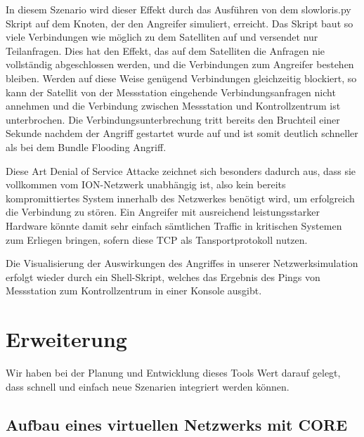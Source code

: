 \documentclass{article}
\begin{document}
In diesem Szenario wird dieser Effekt durch das Ausführen von dem slowloris.py Skript auf dem Knoten, der den Angreifer simuliert, erreicht. Das Skript baut so viele Verbindungen wie möglich zu dem Satelliten auf und versendet nur Teilanfragen. Dies hat den Effekt, das auf dem Satelliten die Anfragen nie vollständig abgeschlossen werden, und die Verbindungen zum Angreifer bestehen bleiben. Werden auf diese Weise genügend Verbindungen gleichzeitig blockiert, so kann der Satellit von der  Messstation eingehende Verbindungsanfragen nicht annehmen und die Verbindung zwischen Messstation und Kontrollzentrum ist unterbrochen. Die Verbindungsunterbrechung tritt bereits den Bruchteil einer Sekunde nachdem der Angriff gestartet wurde auf und ist somit deutlich schneller als bei dem Bundle Flooding Angriff.\par
Diese Art Denial of Service Attacke zeichnet sich besonders dadurch aus, dass sie vollkommen vom ION-Netzwerk unabhängig ist, also kein bereits kompromittiertes System innerhalb des Netzwerkes benötigt wird, um erfolgreich die Verbindung zu stören. Ein Angreifer mit ausreichend leistungsstarker Hardware könnte damit sehr einfach sämtlichen Traffic in kritischen Systemen zum Erliegen bringen, sofern diese TCP als Tansportprotokoll nutzen.\par
Die Visualisierung der Auswirkungen des Angriffes in unserer Netzwerksimulation erfolgt wieder durch ein Shell-Skript, welches das Ergebnis des Pings von Messstation zum Kontrollzentrum in einer Konsole ausgibt.
\newpage
\section{Erweiterung}
Wir haben bei der Planung und Entwicklung dieses Tools Wert darauf gelegt, dass schnell und einfach neue Szenarien integriert werden können.
\subsection{Aufbau eines virtuellen Netzwerks mit CORE}
\end{document}
